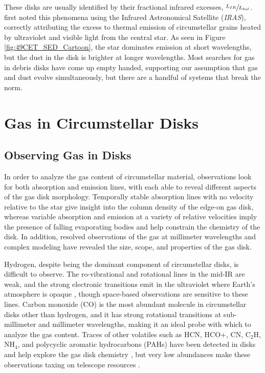 These disks are usually identified by their fractional infrared excesses, $\sfrac{L_{IR}}{L_{bol}}$. \cite{Auma84} first noted this phenomena using the Infrared Astronomical Satellite (\textit{IRAS}), correctly attributing the excess to thermal emission of circumstellar grains heated by ultraviolet and visible light from the central star. As seen in Figure \ref{fig:49CET_SED_Cartoon}, the star dominates emission at short wavelengths, but the dust in the disk is brighter at longer wavelengths. Most searches for gas in debris disks have come up empty handed, supporting our assumption that gas and dust evolve simultaneously, but there are a handful of systems that break the norm. 

\section{Gas in Circumstellar Disks}

\subsection{Observing Gas in Disks}
In order to analyze the gas content of circumstellar material, observations look for both absorption and emission lines, with each able to reveal different aspects of the gas disk morphology. Temporally stable absorption lines with no velocity relative to the star give insight into the column density of the edge-on gas disk, whereas variable absorption and emission at a variety of relative velocities imply the presence of falling evaporating bodies \citep[FEBs,][]{Beus94} and help constrain the chemistry of the disk. In addition, resolved observations of the gas at millimeter wavelengths and complex modeling have revealed the size, scope, and properties of the gas disk. 

Hydrogen, despite being the dominant component of circumstellar disks, is difficult to observe. The ro-vibrational and rotational lines in the mid-IR are weak, and the strong electronic transitions emit in the ultraviolet where Earth's atmosphere is opaque \citep{Haba05}, though space-based observations are sensitive to these lines. Carbon monoxide (CO) is the most abundant molecule in circumstellar disks other than hydrogen, and it has strong rotational transitions at sub-millimeter and millimeter wavelengths, making it an ideal probe with which to analyze the gas content. Traces of other volatiles such as HCN, HCO+, CN, C$_{2}$H, NH$_{4}$, and polycyclic aromatic hydrocarbons (PAHs) have been detected in disks and help explore the gas disk chemistry \citep{Berg09}, but very low abundances make these observations taxing on telescope resources \citep{Viss11}.

